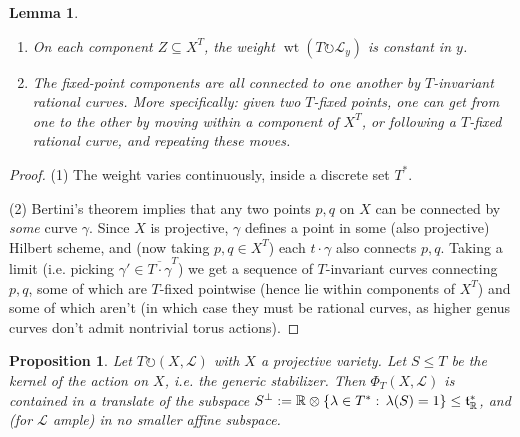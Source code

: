 \documentclass[11pt]{amsart}
\newtheorem{lemma}[Thm]{Lemma}
\newtheorem{proposition}[Thm]{Proposition}
\theoremstyle{definition}
\DeclareMathOperator{\wt}{wt}
\newcommand{\RR}{\mathbb{R}}
\newcommand\lie[1]{{\mathfrak #1}}
\newcommand\tensor\otimes
\newcommand\calL{{\mathcal L}}
\newcommand\actson\circlearrowright
\renewcommand{\colon}{\mathrel{:}}
\renewcommand{\colon}{:\mkern\thinmuskip}
\begin{document}
\begin{lemma}\label{lem:fixedPoints}
  \begin{enumerate}
  \item On each component $Z \subseteq X^T$, the weight
    $\wt(T\actson \calL_y)$ is constant in $y$.
  \item The fixed-point components are all connected to one another
    by $T$-invariant rational curves. More specifically: given two $T$-fixed
    points, one can get from one to the other by moving within a component
    of $X^T$, or following a $T$-fixed rational curve, and repeating
    these moves.
  \end{enumerate}
\end{lemma}

\begin{proof}
  (1) The weight varies continuously, inside a discrete set $T^*$.

  (2) Bertini's theorem implies that any two points $p,q$ on $X$ can
  be connected by {\em some} curve $\gamma$. Since $X$ is projective,
  $\gamma$ defines a point in some (also projective)
  Hilbert scheme, and (now taking $p,q\in X^T$) each $t\cdot \gamma$ also
  connects $p,q$. Taking a limit (i.e. picking
  $\gamma' \in \overline{T\cdot\gamma}^T$)
  we get a sequence of $T$-invariant curves connecting $p,q$, some of which are
  $T$-fixed pointwise (hence lie within components of $X^T$) and some of
  which aren't (in which case they must be rational curves, as higher genus
  curves don't admit nontrivial torus actions). 
\end{proof}

\begin{proposition}\label{prop:spanOfPhi}
  Let $T \actson (X,\calL)$ with $X$ a projective variety.
  Let $S \leq T$ be the kernel of the action on $X$, i.e. the generic
  stabilizer. Then $\Phi_T(X,\calL)$ is contained in a translate of
  the subspace $S^\perp := \RR \tensor \{\lambda \in T^*\colon \lambda(S)=1\}
  \leq \lie t^*_\RR$, and (for $\calL$ ample) in no smaller affine subspace.
\end{proposition}
\end{document}
